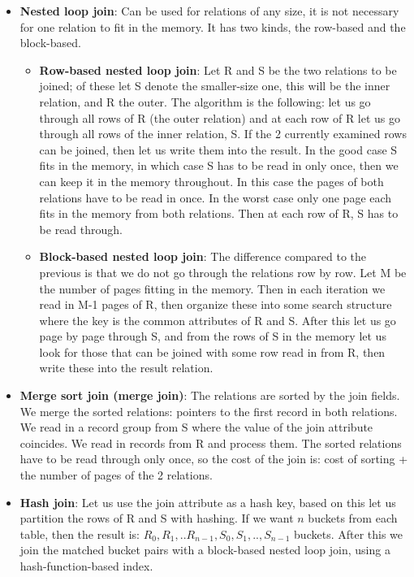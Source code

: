 \documentclass[margin=0px]{article}
\begin{document}
\begin{itemize}
    \item	\textbf{Nested loop join}: Can be used for relations of any size, it is not necessary for
          one relation to fit in the memory. It has two kinds, the row-based and the block-based.
          \begin{itemize}
              \item	\textbf{Row-based nested loop join}: Let R and S be the two relations to be joined; of these let
                    S denote the smaller-size one, this will be the inner relation, and R the outer. The algorithm is the following: let us go through all rows of R (the outer relation)
                    and at each row of R let us go through all rows of the inner relation, S. If the 2 currently examined rows can be joined, then let us write them into the result. In the good case S fits in the memory, in which case S has to be read in only once,
                    then we can keep it in the memory throughout. In this case the pages of both relations have to be read in once. In the worst
                    case only one page each fits in the memory from both relations. Then at each row of R, S has to be read through.

              \item	\textbf{Block-based nested loop join}: The difference compared to the previous is that we do not go through the relations
                    row by row. Let M be the number of pages fitting in the memory. Then in each iteration we read in M-1 pages of R,
                    then organize these into some search structure where the key is the common attributes of R and S. After this let us go
                    page by page through S, and from the rows of S in the memory let us look for those that can be joined with some row read in from R,
                    then write these into the result relation.
          \end{itemize}

    \item	\textbf{Merge sort join (merge join)}: The relations are sorted by the join fields.
          We merge the sorted relations: pointers to the first record in both relations. We read in a record group from S where the value of the join
          attribute coincides. We read in records from R and process them. The sorted relations
          have to be read through only once, so the cost of the join is: cost of sorting + the number of pages of the 2 relations.

    \item	\textbf{Hash join}: Let us use the join attribute as a hash key, based on this
          let us partition the rows of R and S with hashing. If we want $n$ buckets from each table, then the result is: $R_{0},R_{1},..R_{n-1}, S_{0},S_{1},..,S_{n-1}$ buckets. After this we join the matched bucket pairs with a block-based nested loop
          join, using a hash-function-based index.
\end{itemize}
\end{document}

